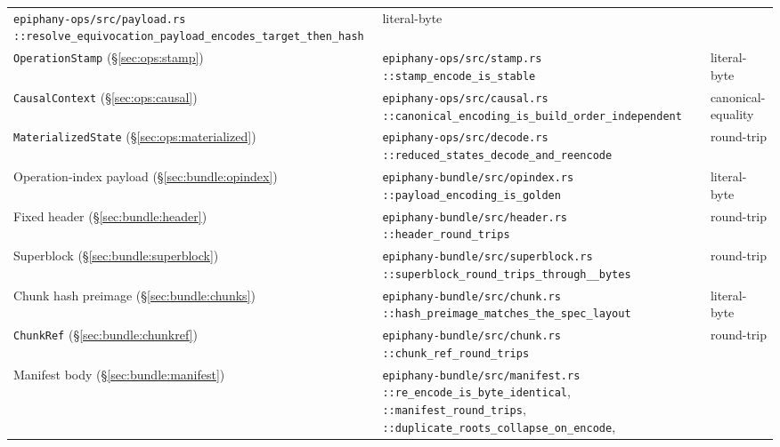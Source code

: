 \documentclass[11pt,letterpaper]{report}
\newcommand{\ub}{\_\allowbreak}
\begin{document}
\begin{longtable}{>{\raggedright\arraybackslash}p{1.5in} >{\raggedright\arraybackslash}p{3.0in} p{1.0in}}
    \texttt{epiphany-ops/src/payload.rs}\newline
    \texttt{::resolve\ub equivocation\ub payload\ub encodes\ub target\ub then\ub hash} &
    literal-byte \\
  \texttt{OperationStamp} (\S\ref{sec:ops:stamp}) &
    \texttt{epiphany-ops/src/stamp.rs}\newline
    \texttt{::stamp\ub encode\ub is\ub stable} &
    literal-byte \\
  \texttt{CausalContext} (\S\ref{sec:ops:causal}) &
    \texttt{epiphany-ops/src/causal.rs}\newline
    \texttt{::canonical\ub encoding\ub is\ub build\ub order\ub independent} &
    canonical-equality \\
  \texttt{MaterializedState} (\S\ref{sec:ops:materialized}) &
    \texttt{epiphany-ops/src/decode.rs}\newline
    \texttt{::reduced\ub states\ub decode\ub and\ub reencode} &
    round-trip \\
  Operation-index payload (\S\ref{sec:bundle:opindex}) &
    \texttt{epiphany-bundle/src/opindex.rs}\newline
    \texttt{::payload\ub encoding\ub is\ub golden} &
    literal-byte \\
  Fixed header (\S\ref{sec:bundle:header}) &
    \texttt{epiphany-bundle/src/header.rs}\newline
    \texttt{::header\ub round\ub trips} &
    round-trip \\
  Superblock (\S\ref{sec:bundle:superblock}) &
    \texttt{epiphany-bundle/src/superblock.rs}\newline
    \texttt{::superblock\ub round\ub trips\ub through\ub 256\ub bytes} &
    round-trip \\
  Chunk hash preimage (\S\ref{sec:bundle:chunks}) &
    \texttt{epiphany-bundle/src/chunk.rs}\newline
    \texttt{::hash\ub preimage\ub matches\ub the\ub spec\ub layout} &
    literal-byte \\
  \texttt{ChunkRef} (\S\ref{sec:bundle:chunkref}) &
    \texttt{epiphany-bundle/src/chunk.rs}\newline
    \texttt{::chunk\ub ref\ub round\ub trips} &
    round-trip \\
  Manifest body (\S\ref{sec:bundle:manifest}) &
    \texttt{epiphany-bundle/src/manifest.rs}\newline
    \texttt{::re\ub encode\ub is\ub byte\ub identical},
    \texttt{::manifest\ub round\ub trips},
    \texttt{::duplicate\ub roots\ub collapse\ub on\ub encode},

\end{longtable}
\end{document}
